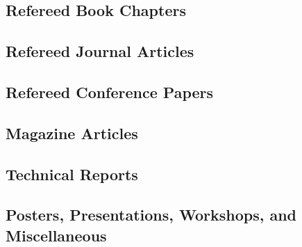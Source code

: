 \subsection{Refereed Book Chapters}
\begin{refsection}
\nocite{*}
\printbibliography[heading=none,sorting=ynt]
\end{refsection}

\subsection{Refereed Journal Articles}
\begin{refsection}
\nocite{*}
\printbibliography[heading=none,sorting=ynt]
\end{refsection}

\subsection{Refereed Conference Papers}
\begin{refsection}
\nocite{*}
\printbibliography[heading=none,sorting=ynt]
\end{refsection}

\subsection{Magazine Articles}
\begin{refsection}
\nocite{*}
\printbibliography[heading=none,sorting=ynt]
\end{refsection}

\subsection{Technical Reports}
\begin{refsection}
\nocite{*}
\printbibliography[heading=none,sorting=ynt]
\end{refsection}

\subsection{Posters, Presentations, Workshops, and Miscellaneous}
\begin{refsection}
\nocite{*}
\printbibliography[heading=none,sorting=ynt]
\end{refsection}


